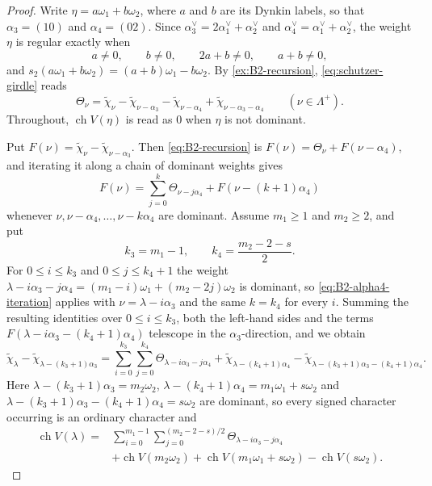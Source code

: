 \documentclass[11pt]{article}
\theoremstyle{definition}
\theoremstyle{remark}
\newcommand{\Pesos}{\Lambda}
\newcommand{\chr}{\operatorname{ch}}
\begin{document}
\begin{proof}
Write $\eta=a\omega_1+b\omega_2$, where $a$ and $b$ are its Dynkin
labels, so that $\alpha_3=(10)$ and $\alpha_4=(02)$.  Since
$\alpha_3^\vee=2\alpha_1^\vee+\alpha_2^\vee$ and
$\alpha_4^\vee=\alpha_1^\vee+\alpha_2^\vee$, the weight $\eta$ is regular
exactly when
\begin{equation}\label{eq:B2-regularity}
 a\ne0,\qquad b\ne0,\qquad 2a+b\ne0,\qquad a+b\ne0,
\end{equation}
and $s_2(a\omega_1+b\omega_2)=(a+b)\omega_1-b\omega_2$.  By \cref{ex:B2-recursion},
\eqref{eq:schutzer-girdle} reads
\begin{equation}\label{eq:B2-recursion}
 \Theta_\nu=\widetilde\chi_\nu-\widetilde\chi_{\nu-\alpha_3}
   -\widetilde\chi_{\nu-\alpha_4}+\widetilde\chi_{\nu-\alpha_3-\alpha_4}
 \qquad(\nu\in\Pesos^+).
\end{equation}
Throughout, $\chr V(\eta)$ is read as $0$ when $\eta$ is not dominant.

Put $F(\nu)=\widetilde\chi_\nu-\widetilde\chi_{\nu-\alpha_3}$.  Then
\eqref{eq:B2-recursion} is $F(\nu)=\Theta_\nu+F(\nu-\alpha_4)$, and iterating
it along a chain of dominant weights gives
\begin{equation}\label{eq:B2-alpha4-iteration}
 F(\nu)=\sum_{j=0}^{k}\Theta_{\nu-j\alpha_4}+F(\nu-(k+1)\alpha_4)
\end{equation}
whenever $\nu,\nu-\alpha_4,\ldots,\nu-k\alpha_4$ are dominant.  Assume
$m_1\ge1$ and $m_2\ge2$, and put
\[
 k_3=m_1-1,\qquad k_4=\frac{m_2-2-s}{2}.
\]
For $0\le i\le k_3$ and $0\le j\le k_4+1$ the weight
$\lambda-i\alpha_3-j\alpha_4=(m_1-i)\omega_1+(m_2-2j)\omega_2$ is dominant, so
\eqref{eq:B2-alpha4-iteration} applies with $\nu=\lambda-i\alpha_3$ and the
same $k=k_4$ for every $i$.  Summing the resulting identities over
$0\le i\le k_3$, both the left-hand sides and the terms
$F(\lambda-i\alpha_3-(k_4+1)\alpha_4)$ telescope in the
$\alpha_3$-direction, and we obtain
\[
 \widetilde\chi_\lambda-\widetilde\chi_{\lambda-(k_3+1)\alpha_3}
  =\sum_{i=0}^{k_3}\sum_{j=0}^{k_4}\Theta_{\lambda-i\alpha_3-j\alpha_4}
   +\widetilde\chi_{\lambda-(k_4+1)\alpha_4}
   -\widetilde\chi_{\lambda-(k_3+1)\alpha_3-(k_4+1)\alpha_4}.
\]
Here $\lambda-(k_3+1)\alpha_3=m_2\omega_2$,
$\lambda-(k_4+1)\alpha_4=m_1\omega_1+s\omega_2$ and
$\lambda-(k_3+1)\alpha_3-(k_4+1)\alpha_4=s\omega_2$ are dominant, so every
signed character occurring is an ordinary character and
\begin{align}\label{eq:B2-telescope}
 \chr V(\lambda)={}&
 \sum_{i=0}^{m_1-1}\sum_{j=0}^{(m_2-2-s)/2}
       \Theta_{\lambda-i\alpha_3-j\alpha_4}\\
 &+\chr V(m_2\omega_2)
  +\chr V(m_1\omega_1+s\omega_2)-\chr V(s\omega_2).\nonumber
\end{align}


\end{proof}
\end{document}
